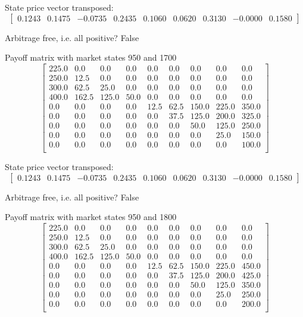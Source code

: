 \documentclass{article}
\begin{document}
State price vector transposed: \[
    \begin{bmatrix} 0.1243 & 0.1475 & -0.0735 & 0.2435 & 0.1060 & 0.0620 & 0.3130 & -0.0000 & 0.1580 \end{bmatrix}
\]

Arbitrage free, i.e. all positive? False

Payoff matrix with market states 950 and 1700
\[
    \begin{bmatrix}
        225.0 & 0.0   & 0.0   & 0.0  & 0.0  & 0.0  & 0.0   & 0.0   & 0.0   \\
        250.0 & 12.5  & 0.0   & 0.0  & 0.0  & 0.0  & 0.0   & 0.0   & 0.0   \\
        300.0 & 62.5  & 25.0  & 0.0  & 0.0  & 0.0  & 0.0   & 0.0   & 0.0   \\
        400.0 & 162.5 & 125.0 & 50.0 & 0.0  & 0.0  & 0.0   & 0.0   & 0.0   \\
        0.0   & 0.0   & 0.0   & 0.0  & 12.5 & 62.5 & 150.0 & 225.0 & 350.0 \\
        0.0   & 0.0   & 0.0   & 0.0  & 0.0  & 37.5 & 125.0 & 200.0 & 325.0 \\
        0.0   & 0.0   & 0.0   & 0.0  & 0.0  & 0.0  & 50.0  & 125.0 & 250.0 \\
        0.0   & 0.0   & 0.0   & 0.0  & 0.0  & 0.0  & 0.0   & 25.0  & 150.0 \\
        0.0   & 0.0   & 0.0   & 0.0  & 0.0  & 0.0  & 0.0   & 0.0   & 100.0 \\
    \end{bmatrix}
\]

State price vector transposed: \[
    \begin{bmatrix} 0.1243 & 0.1475 & -0.0735 & 0.2435 & 0.1060 & 0.0620 & 0.3130 & -0.0000 & 0.1580 \end{bmatrix}
\]

Arbitrage free, i.e. all positive? False

Payoff matrix with market states 950 and 1800
\[
    \begin{bmatrix}
        225.0 & 0.0   & 0.0   & 0.0  & 0.0  & 0.0  & 0.0   & 0.0   & 0.0   \\
        250.0 & 12.5  & 0.0   & 0.0  & 0.0  & 0.0  & 0.0   & 0.0   & 0.0   \\
        300.0 & 62.5  & 25.0  & 0.0  & 0.0  & 0.0  & 0.0   & 0.0   & 0.0   \\
        400.0 & 162.5 & 125.0 & 50.0 & 0.0  & 0.0  & 0.0   & 0.0   & 0.0   \\
        0.0   & 0.0   & 0.0   & 0.0  & 12.5 & 62.5 & 150.0 & 225.0 & 450.0 \\
        0.0   & 0.0   & 0.0   & 0.0  & 0.0  & 37.5 & 125.0 & 200.0 & 425.0 \\
        0.0   & 0.0   & 0.0   & 0.0  & 0.0  & 0.0  & 50.0  & 125.0 & 350.0 \\
        0.0   & 0.0   & 0.0   & 0.0  & 0.0  & 0.0  & 0.0   & 25.0  & 250.0 \\
        0.0   & 0.0   & 0.0   & 0.0  & 0.0  & 0.0  & 0.0   & 0.0   & 200.0 \\
    \end{bmatrix}
\]
\end{document}
